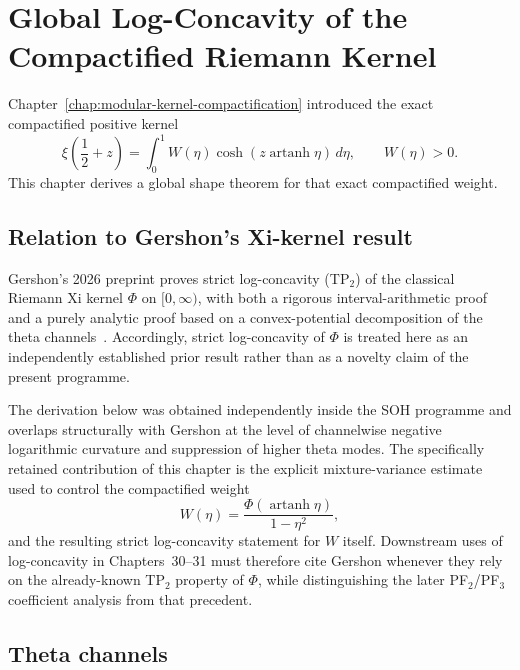 \chapter{Global Log-Concavity of the Compactified Riemann Kernel}
\label{ch:global-log-concavity}


Chapter~\ref{chap:modular-kernel-compactification} introduced the exact compactified positive kernel
\[
\xi\!\left(\frac12+z\right)
=\int_0^1 W(\eta)\cosh\!\left(z\operatorname{artanh}\eta\right)\,d\eta,
\qquad W(\eta)>0.
\]
This chapter derives a global shape theorem for that exact compactified weight.

\section{Relation to Gershon's Xi-kernel result}

Gershon's 2026 preprint proves strict log-concavity (TP$_2$) of the classical Riemann Xi kernel $\Phi$ on $[0,\infty)$, with both a rigorous interval-arithmetic proof and a purely analytic proof based on a convex-potential decomposition of the theta channels~\cite{gershon2026logconcavity}. Accordingly, strict log-concavity of $\Phi$ is treated here as an independently established prior result rather than as a novelty claim of the present programme.

The derivation below was obtained independently inside the SOH programme and overlaps structurally with Gershon at the level of channelwise negative logarithmic curvature and suppression of higher theta modes. The specifically retained contribution of this chapter is the explicit mixture-variance estimate used to control the compactified weight
\[
W(\eta)=\frac{\Phi(\operatorname{artanh}\eta)}{1-\eta^2},
\]
and the resulting strict log-concavity statement for $W$ itself. Downstream uses of log-concavity in Chapters~30--31 must therefore cite Gershon whenever they rely on the already-known TP$_2$ property of $\Phi$, while distinguishing the later PF$_2$/PF$_3$ coefficient analysis from that precedent.

\section{Theta channels}

